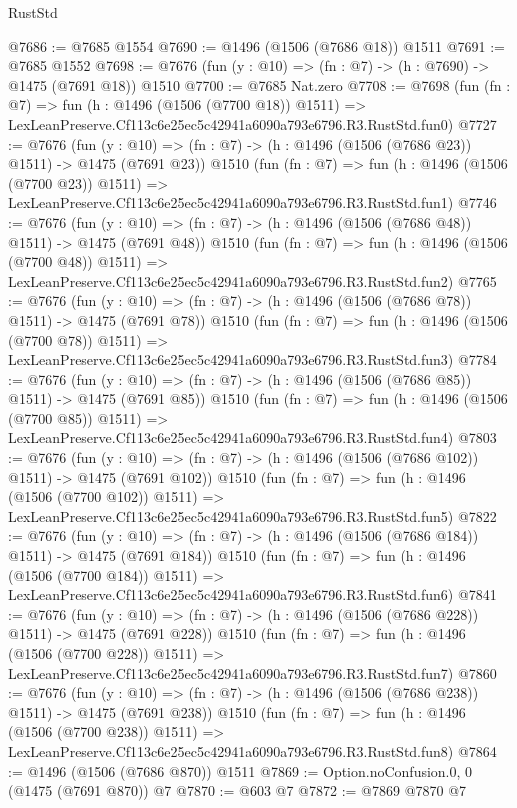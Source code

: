 \begin{lexlean}{RustStd}
\begin{coremodule}
@7686 := @7685 @1554
@7690 := @1496 (@1506 (@7686 @18)) @1511
@7691 := @7685 @1552
@7698 := @7676 (fun (y : @10) => (fn : @7) -> (h : @7690) -> @1475 (@7691 @18)) @1510
@7700 := @7685 Nat.zero
@7708 := @7698
    (fun (fn : @7) =>
    fun (h : @1496 (@1506 (@7700 @18)) @1511) =>
    LexLeanPreserve.Cf113c6e25ec5c42941a6090a793e6796.R3.RustStd.fun0)
@7727 := @7676
    (fun (y : @10) => (fn : @7) -> (h : @1496 (@1506 (@7686 @23)) @1511) -> @1475 (@7691 @23))
    @1510
    (fun (fn : @7) =>
    fun (h : @1496 (@1506 (@7700 @23)) @1511) =>
    LexLeanPreserve.Cf113c6e25ec5c42941a6090a793e6796.R3.RustStd.fun1)
@7746 := @7676
    (fun (y : @10) => (fn : @7) -> (h : @1496 (@1506 (@7686 @48)) @1511) -> @1475 (@7691 @48))
    @1510
    (fun (fn : @7) =>
    fun (h : @1496 (@1506 (@7700 @48)) @1511) =>
    LexLeanPreserve.Cf113c6e25ec5c42941a6090a793e6796.R3.RustStd.fun2)
@7765 := @7676
    (fun (y : @10) => (fn : @7) -> (h : @1496 (@1506 (@7686 @78)) @1511) -> @1475 (@7691 @78))
    @1510
    (fun (fn : @7) =>
    fun (h : @1496 (@1506 (@7700 @78)) @1511) =>
    LexLeanPreserve.Cf113c6e25ec5c42941a6090a793e6796.R3.RustStd.fun3)
@7784 := @7676
    (fun (y : @10) => (fn : @7) -> (h : @1496 (@1506 (@7686 @85)) @1511) -> @1475 (@7691 @85))
    @1510
    (fun (fn : @7) =>
    fun (h : @1496 (@1506 (@7700 @85)) @1511) =>
    LexLeanPreserve.Cf113c6e25ec5c42941a6090a793e6796.R3.RustStd.fun4)
@7803 := @7676
    (fun (y : @10) => (fn : @7) -> (h : @1496 (@1506 (@7686 @102)) @1511) -> @1475 (@7691 @102))
    @1510
    (fun (fn : @7) =>
    fun (h : @1496 (@1506 (@7700 @102)) @1511) =>
    LexLeanPreserve.Cf113c6e25ec5c42941a6090a793e6796.R3.RustStd.fun5)
@7822 := @7676
    (fun (y : @10) => (fn : @7) -> (h : @1496 (@1506 (@7686 @184)) @1511) -> @1475 (@7691 @184))
    @1510
    (fun (fn : @7) =>
    fun (h : @1496 (@1506 (@7700 @184)) @1511) =>
    LexLeanPreserve.Cf113c6e25ec5c42941a6090a793e6796.R3.RustStd.fun6)
@7841 := @7676
    (fun (y : @10) => (fn : @7) -> (h : @1496 (@1506 (@7686 @228)) @1511) -> @1475 (@7691 @228))
    @1510
    (fun (fn : @7) =>
    fun (h : @1496 (@1506 (@7700 @228)) @1511) =>
    LexLeanPreserve.Cf113c6e25ec5c42941a6090a793e6796.R3.RustStd.fun7)
@7860 := @7676
    (fun (y : @10) => (fn : @7) -> (h : @1496 (@1506 (@7686 @238)) @1511) -> @1475 (@7691 @238))
    @1510
    (fun (fn : @7) =>
    fun (h : @1496 (@1506 (@7700 @238)) @1511) =>
    LexLeanPreserve.Cf113c6e25ec5c42941a6090a793e6796.R3.RustStd.fun8)
@7864 := @1496 (@1506 (@7686 @870)) @1511
@7869 := Option.noConfusion.{0, 0} (@1475 (@7691 @870)) @7
@7870 := @603 @7
@7872 := @7869 @7870 @7

\end{coremodule}
\end{lexlean}
